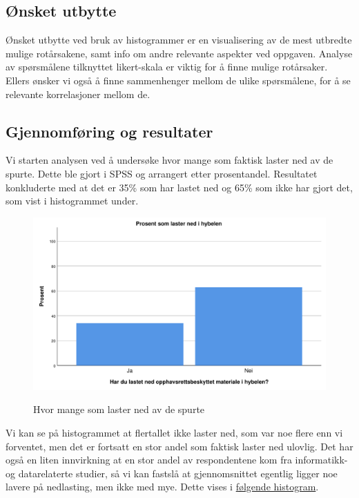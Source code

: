 \subsection{Ønsket utbytte}
Ønsket utbytte ved bruk av histogrammer er en visualisering av de mest utbredte mulige rotårsakene, samt info om andre relevante aspekter ved oppgaven. Analyse av spørsmålene tilknyttet likert-skala er viktig for å finne mulige rotårsaker. Ellers ønsker vi også å finne sammenhenger mellom de ulike spørsmålene, for å se relevante korrelasjoner mellom de.


\subsection{Gjennomføring og resultater}
Vi starten analysen ved å undersøke hvor mange som faktisk laster ned av de spurte. Dette ble gjort i SPSS og arrangert etter prosentandel. Resultatet konkluderte med at det er 35\% som har lastet ned og 65\% som ikke har gjort det, som vist i histogrammet under.

\begin{figure}[H]
    \centering
    \includegraphics[scale=0.45]{case_1/bilder/lasterned.pdf}
    \label{fig:lasterned}
    \caption[Laster ned]{Hvor mange som laster ned av de spurte}
\end{figure}

Vi kan se på histogrammet at flertallet ikke laster ned, som var noe flere enn vi forventet, men det er fortsatt en stor andel som faktisk laster ned ulovlig. Det har også en liten innvirkning at en stor andel av respondentene kom fra informatikk- og datarelaterte studier, så vi kan fastslå at gjennomsnittet egentlig ligger noe lavere på nedlasting, men ikke med mye. Dette vises i \hyperref[fig:IT-lasterned]{følgende histogram}.

